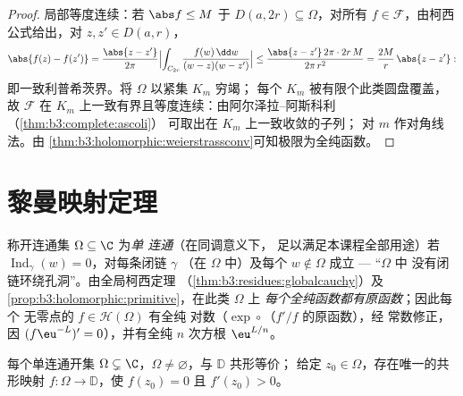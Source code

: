 \begin{proof}
局部等度连续：若 $\abs f \leq M$ 于 $D(a, 2r)
\subseteq \Omega$，对所有 $f \in \mathcal F$，由柯西
公式给出，对 $z, z' \in D(a, r)$，
\[
\abs{f(z) - f(z')} = \frac{\abs{z - z'}}{2\pi}
\Bigl|\int_{C_{2r}}\frac{f(w)\,\dd w}{(w-z)(w-z')}\Bigr|
\leq \frac{\abs{z - z'}\,2\pi\cdot2r\,M}{2\pi\,r^2}
= \frac{2M}{r}\,\abs{z - z'} :
\]
即一致利普希茨界。将 $\Omega$ 以紧集 $K_m$ 穷竭；
每个 $K_m$ 被有限个此类圆盘覆盖，故
$\mathcal F$ 在
$K_m$ 上一致有界且等度连续：由阿尔泽拉–阿斯科利（\cref{thm:b3:complete:ascoli}）
可取出在 $K_m$ 上一致收敛的子列；
对 $m$ 作对角线法。由
\cref{thm:b3:holomorphic:weierstrassconv}可知极限为全纯函数。
\end{proof}

\section{黎曼映射定理}

\begin{definition}\label{def:b3:conformal:simplyconnected}
称开连通集 $\Omega \subseteq \C$ 为\emph{单
连通}（在同调意义下，
足以满足本课程全部用途）若
$\operatorname{Ind}_\gamma(w) = 0$，对每条闭链 $\gamma$
（在 $\Omega$ 中）及每个 $w \notin \Omega$ 成立 --- “$\Omega$ 中
没有闭链环绕孔洞”。由全局柯西定理
（\cref{thm:b3:residues:globalcauchy}）及
\cref{prop:b3:holomorphic:primitive}，在此类 $\Omega$ 上
\emph{每个全纯函数都有原函数}；因此每个
无零点的 $f \in \mathcal H(\Omega)$ 有全纯
对数（$\exp\circ$（$f'/f$ 的原函数），经
常数修正，因 $(f\eu^{-L})' = 0$），并有全纯 $n$ 次方根
$\eu^{L/n}$。
\end{definition}

\begin{theorem}[黎曼映射定理]
\label{thm:b3:conformal:rmt}
每个单连通开集 $\Omega \subsetneq \C$，$\Omega
\neq \varnothing$，与 $\mathbb D$ 共形等价；
给定 $z_0 \in \Omega$，存在唯一的共形映射 $f \colon
\Omega \to \mathbb D$，使 $f(z_0) = 0$ 且 $f'(z_0) >
0$。
\end{theorem}

